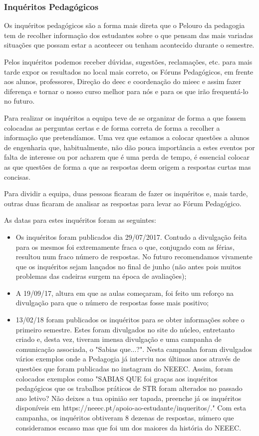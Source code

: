 
\subsubsection{Inquéritos Pedagógicos}

Os inquéritos pedagógicos são a forma mais direta que o Pelouro da pedagogia tem de recolher informação dos estudantes sobre o que pensam das mais variadas situações que possam estar a acontecer ou tenham acontecido durante o semestre.

Pelos inquéritos podemos receber dúvidas, sugestões, reclamações, etc. para mais tarde expor os resultados no local mais correto, os Fóruns Pedagógicos, em frente aos alunos, professores, Direção do \acrshort{deec} e coordenação do \acrshort{mieec} e assim fazer diferença e tornar o nosso curso melhor para nós e para os que irão frequentá-lo no futuro.

Para realizar os inquéritos a equipa teve de se organizar de forma a que fossem colocadas as perguntas certas e de forma correta de forma a recolher a informação que pretendíamos. Uma vez que estamos a colocar questões a alunos de engenharia que, habitualmente, não dão pouca importância a estes eventos por falta de interesse ou por acharem que é uma perda de tempo, é essencial colocar as que questões de forma a que as respostas deem origem a respostas curtas mas concisas.

Para dividir a equipa, duas pessoas ficaram de fazer os inquéritos e, mais tarde, outras duas ficaram de analisar as respostas para levar ao Fórum Pedagógico.

As datas para estes inquéritos foram as seguintes:
\begin{itemize}
\item Os inquéritos foram publicados dia 29/07/2017. Contudo a divulgação feita para os mesmos foi extremamente fraca o que, conjugado com as férias, resultou num fraco número de respostas. No futuro recomendamos vivamente que os inquéritos sejam lançados no final de junho (não antes pois muitos problemas das cadeiras surgem na época de avaliações);
\item A 19/09/17, altura em que as aulas começaram, foi feito um reforço na divulgação para que o número de respostas fosse mais positivo;
\item 13/02/18 foram publicados os inquéritos para se obter informações sobre o primeiro semestre. Estes foram divulgados no site do núcleo, entretanto criado e, desta vez, tiveram imensa divulgação e uma campanha de comunicação associada, o "Sabias que...?". Nesta campanha foram divulgados vários exemplos onde a Pedagogia já interviu nos últimos anos através de questões que foram publicadas no instagram do NEEEC. Assim, foram colocados exemplos como "SABIAS QUE foi graças aos inquéritos pedagógicos que os trabalhos práticos de STR foram alterados no passado ano letivo? Não deixes a tua opinião ser tapada, preenche já os inquéritos disponíveis em https://neeec.pt/apoio-ao-estudante/inqueritos/." Com esta campanha, os inquéritos obtiveram 8 dezenas de respostas, número que consideramos escasso mas que foi um dos maiores da história do NEEEC.
\end{itemize}